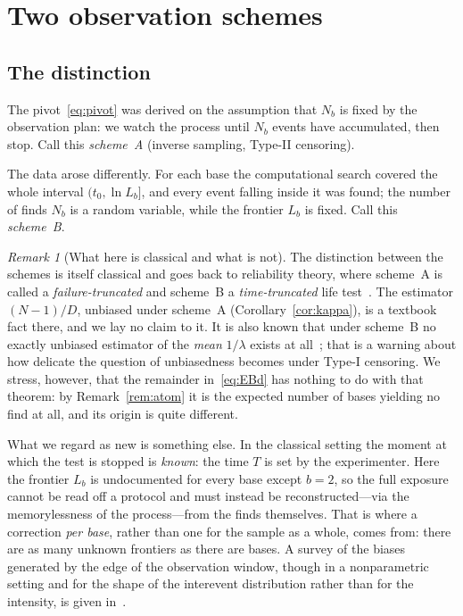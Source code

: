 \documentclass[11pt,a4paper]{article}
\theoremstyle{plain}
\theoremstyle{remark}
\newtheorem{remark}{Remark}
\begin{document}
\section{Two observation schemes}\label{sec:scheme}

\subsection{The distinction}

The pivot~\eqref{eq:pivot} was derived on the assumption that $N_b$ is fixed by
the observation plan: we watch the process until $N_b$ events have accumulated,
then stop. Call this \emph{scheme~A} (inverse sampling, Type-II censoring).

The data arose differently. For each base the computational search covered the
whole interval $(t_0,\ln L_b]$, and every event falling inside it was found; the
number of finds $N_b$ is a random variable, while the frontier $L_b$ is fixed.
Call this \emph{scheme~B}.

\begin{remark}[What here is classical and what is not]\label{rem:priority}
The distinction between the schemes is itself classical and goes back to
reliability theory, where scheme~A is called a \emph{failure-truncated} and
scheme~B a \emph{time-truncated} life test~\cite{epstein1954trunc,%
epsteinsobel1954}. The estimator $(N-1)/D$, unbiased under scheme~A
(Corollary~\ref{cor:kappa}), is a textbook fact there, and we lay no claim to
it. It is also known that under scheme~B no exactly unbiased estimator of the
\emph{mean} $1/\lambda$ exists at all~\cite{bartholomew1963,basu1964}; that is a
warning about how delicate the question of unbiasedness becomes under Type-I
censoring. We stress, however, that the remainder in~\eqref{eq:EBd} has nothing
to do with that theorem: by Remark~\ref{rem:atom} it is the expected number of
bases yielding no find at all, and its origin is quite different.

What we regard as new is something else. In the classical setting the moment at
which the test is stopped is \emph{known}: the time $T$ is set by the
experimenter. Here the frontier $L_b$ is undocumented for every base except
$b=2$, so the full exposure cannot be read off a protocol and must instead be
reconstructed---via the memorylessness of the process---from the finds
themselves. That is where a correction \emph{per base}, rather than one for the
sample as a whole, comes from: there are as many unknown frontiers as there are
bases. A survey of the biases generated by the edge of the observation window,
though in a nonparametric setting and for the shape of the interevent
distribution rather than for the intensity, is given in~\cite{kivela2015}.
\end{remark}
\end{document}
